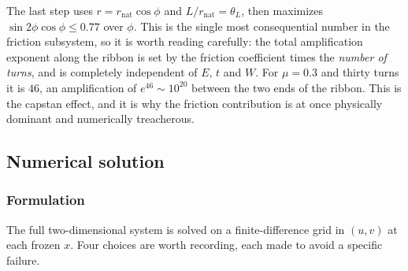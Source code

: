 \documentclass[11pt]{article}
\begin{document}
The last step uses $r = r_{\mathrm{nat}}\cos\phi$ and
$L/r_{\mathrm{nat}} = \theta_L$, then maximizes
$\sin 2\phi\cos\phi \le 0.77$ over $\phi$. This is the single most consequential
number in the friction subsystem, so it is worth reading carefully: the total
amplification exponent along the ribbon is set by the friction coefficient times
the \emph{number of turns}, and is completely independent of $E$, $t$ and $W$.
For $\mu = 0.3$ and thirty turns it is $46$, an amplification of
$e^{46} \sim 10^{20}$ between the two ends of the ribbon. This is the capstan
effect, and it is why the friction contribution is at once physically dominant
and numerically treacherous.

\subsection{Numerical solution}\label{sec:numerical}
\subsubsection*{Formulation}\label{sec:numerical_formulation}
The full two-dimensional system is solved on a finite-difference grid in $(u,v)$
at each frozen $x$. Four choices are worth recording, each made to avoid a
specific failure.
\end{document}
